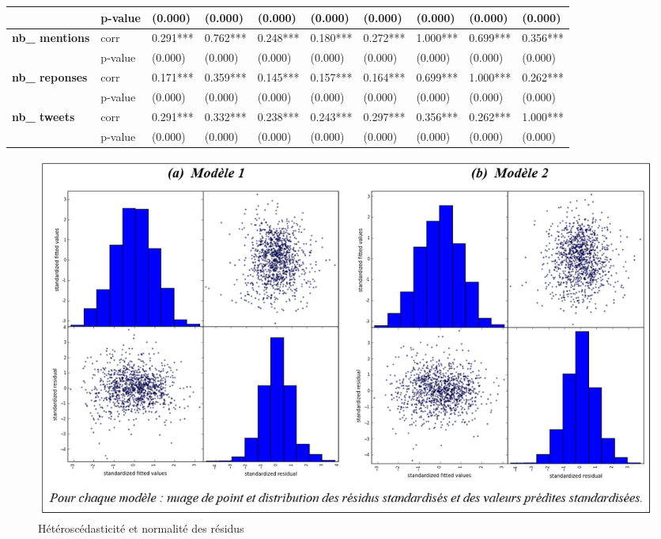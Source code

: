 \begin{landscape}
\begin{table}
\begin{footnotesize}
\begin{tabularx}{\linewidth}{|p{2cm}|X|X|X|X|X|X|X|X|X|}
                    \cline{2-10}
                    &p-value&(0.000)&	(0.000)&	(0.000)	&(0.000)&	(0.000)	&(0.000)&	(0.000)&	(0.000)
                    \\ \hline
                \multirow{2}{=}{\textbf{nb\_ mentions}}
                    &corr&0.291***&	0.762***&	0.248***&	0.180***&	0.272***&	1.000***&	0.699***&	0.356***\\
                    \cline{2-10}
                    &p-value&(0.000)&	(0.000)	&(0.000)&	(0.000)&	(0.000)	&(0.000)&	(0.000)	&(0.000)
                    \\ \hline
                \multirow{2}{=}{\textbf{nb\_ reponses}}
                    &corr&0.171***&	0.359***&	0.145***	&0.157***	&0.164***&	0.699***&	1.000***&	0.262***\\
                    \cline{2-10}
                    &p-value&(0.000)	&(0.000)&	(0.000)	&(0.000)&	(0.000)	&(0.000)&	(0.000)	&(0.000)
                    \\ \hline
                \multirow{2}{=}{\textbf{nb\_ tweets}}
                    &corr&0.291***&	0.332***&	0.238***&	0.243***&	0.297***&	0.356***&	0.262***&	1.000*** \\
                    \cline{2-10}
                    &p-value&(0.000)&	(0.000)	&(0.000)&	(0.000)	&(0.000)&	(0.000)	&(0.000)&	(0.000)
                    \\ \hline

                \end{tabularx}
            \end{footnotesize}
            \end{table}
        \end{landscape}


        \begin{landscape}
        \begin{figure}
            \caption{Hétéroscédasticité et normalité des résidus}
            \label{figure:5residus}
            \includegraphics[width = \linewidth]{fig/fig5.PNG}
        \end{figure}
        \end{landscape}


